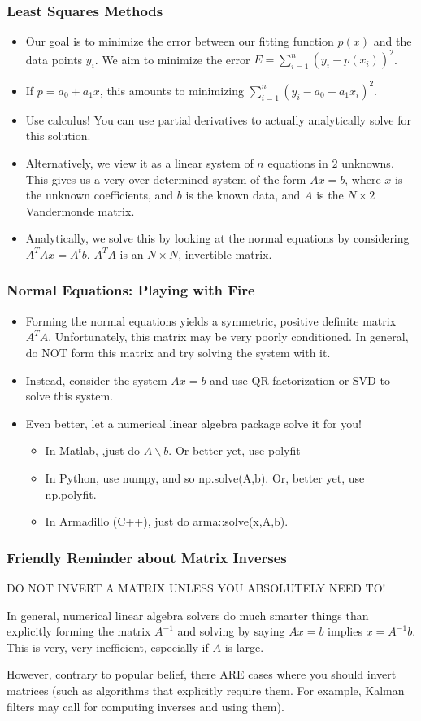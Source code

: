 \documentclass{beamer}
\begin{document}
\begin{frame}
\frametitle{Least Squares Methods}
\begin{itemize}
\item Our goal is to minimize the error between our fitting function $p(x)$ and the data points $y_i$. We aim to minimize the error $E = \sum_{i=1}^n (y_i - p(x_i) )^2$.
\item If $p = a_0 + a_1x$, this amounts to minimizing $\sum_{i=1}^n (y_i - a_0 -a_1x_i)^2$.
\item Use calculus! You can use partial derivatives to actually analytically solve for this solution.
\item Alternatively, we view it as a linear system of $n$ equations in $2$ unknowns. This gives us a very over-determined system of the form $Ax = b$, where $x$ is the unknown coefficients, and $b$ is the known data, and $A$ is the $N \times 2$ Vandermonde matrix.
\item Analytically, we solve this by looking at the normal equations by considering $A^TAx = A^tb$. $A^TA$ is an $N \times N$, invertible matrix.
\end{itemize}
\end{frame}
\begin{frame}
\frametitle{Normal Equations: Playing with Fire}
\begin{itemize}
\item Forming the normal equations yields a symmetric, positive definite matrix $A^TA$. Unfortunately, this matrix may be very poorly conditioned. In general, do NOT form this matrix and try solving the system with it.
\item Instead, consider the system $Ax=b$ and use QR factorization or SVD to solve this system.
\item Even better, let a numerical linear algebra package solve it for you!
\begin{itemize}
\item In Matlab, ,just do $A\backslash b$. Or better yet, use polyfit 
\item In Python, use numpy, and so np.solve(A,b). Or, better yet, use np.polyfit.
\item In Armadillo (C++), just do arma::solve(x,A,b).
\end{itemize}
\end{itemize}
\end{frame}

\begin{frame}
\frametitle{Friendly Reminder about Matrix Inverses}
DO NOT INVERT A MATRIX UNLESS YOU ABSOLUTELY NEED TO!

In general, numerical linear algebra solvers do much smarter things than explicitly forming the matrix $A^{-1}$ and solving by saying $Ax = b $ implies $x = A^{-1}b$. This is very, very inefficient, especially if $A$ is large.

However, contrary to popular belief, there ARE cases where you should invert matrices (such as algorithms that explicitly require them. For example, Kalman filters may call for computing inverses and using them).
\end{frame}
\end{document}
